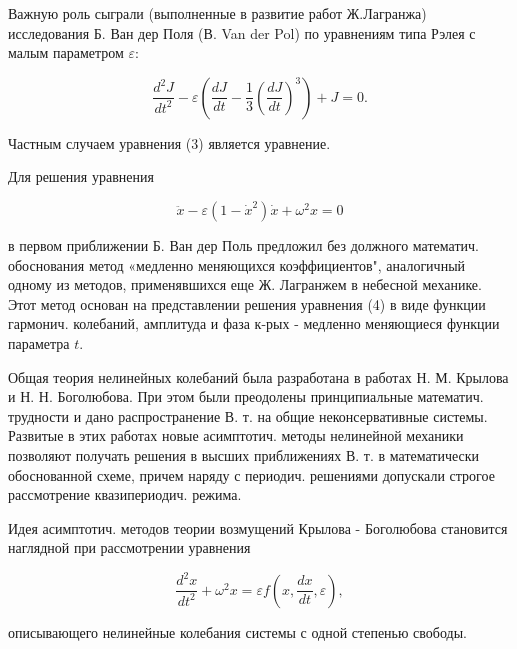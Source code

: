 \documentclass[10pt]{article}
\begin{document}
Важную роль сыграли (выполненные в развитие работ Ж.Лагранжа) исследования Б. Ван дер Поля (В. Van der Pol) по уравнениям типа Рэлея с малым параметром $\varepsilon:$



\[

\frac{d^{2} J}{d t^{2}}-\varepsilon\left(\frac{d J}{d t}-\frac{1}{3}\left(\frac{d J}{d t}\right)^{3}\right)+J=0 .

\]



Частным случаем уравнения (3) является уравнение.



Для решения уравнения



\[

\ddot{x}-\varepsilon\left(1-\dot{x}^{2}\right) \dot{x}+\omega^{2} x=0

\]



в первом приближении Б. Ван дер Поль предложил без должного математич. обоснования метод «медленно меняющихся коэффициентов", аналогичный одному из методов, применявшихся еще Ж. Лагранжем в небесной механике. Этот метод основан на представлении решения уравнения (4) в виде функции гармонич. колебаний, амплитуда и фаза к-рых - медленно меняющиеся функции параметра $t$.



Общая теория нелинейных колебаний была разработана в работах Н. М. Крылова и Н. Н. Боголюбова. При этом были преодолены принципиальные математич. трудности и дано распространение В. т. на общие неконсервативные системы. Развитые в этих работах новые асимптотич. методы нелинейной механики позволяют получать решения в высших приближениях В. т. в математически обоснованной схеме, причем наряду с периодич. решениями допускали строгое рассмотрение квазипериодич. режима.



Идея асимптотич. методов теории возмущений Крылова - Боголюбова становится наглядной при рассмотрении уравнения



\[

\frac{d^{2} x}{d t^{2}}+\omega^{2} x=\varepsilon f\left(x, \frac{d x}{d t}, \varepsilon\right),

\]



описывающего нелинейные колебания системы с одной степенью свободы.
\end{document}

